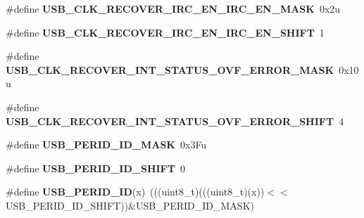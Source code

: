 \begin{DoxyCompactItemize}
\item 
\#define {\bfseries U\+S\+B\+\_\+\+C\+L\+K\+\_\+\+R\+E\+C\+O\+V\+E\+R\+\_\+\+I\+R\+C\+\_\+\+E\+N\+\_\+\+I\+R\+C\+\_\+\+E\+N\+\_\+\+M\+A\+SK}~0x2u\hypertarget{group__USB__Register__Masks_ga0ec64449ae278fc895d80fe9d85882be}{}\label{group__USB__Register__Masks_ga0ec64449ae278fc895d80fe9d85882be}

\item 
\#define {\bfseries U\+S\+B\+\_\+\+C\+L\+K\+\_\+\+R\+E\+C\+O\+V\+E\+R\+\_\+\+I\+R\+C\+\_\+\+E\+N\+\_\+\+I\+R\+C\+\_\+\+E\+N\+\_\+\+S\+H\+I\+FT}~1\hypertarget{group__USB__Register__Masks_ga2e1faca39a2e63ef3c4939b39e8b10c0}{}\label{group__USB__Register__Masks_ga2e1faca39a2e63ef3c4939b39e8b10c0}

\item 
\#define {\bfseries U\+S\+B\+\_\+\+C\+L\+K\+\_\+\+R\+E\+C\+O\+V\+E\+R\+\_\+\+I\+N\+T\+\_\+\+S\+T\+A\+T\+U\+S\+\_\+\+O\+V\+F\+\_\+\+E\+R\+R\+O\+R\+\_\+\+M\+A\+SK}~0x10u\hypertarget{group__USB__Register__Masks_ga159e6afded3ea1fd5360f35010beef77}{}\label{group__USB__Register__Masks_ga159e6afded3ea1fd5360f35010beef77}

\item 
\#define {\bfseries U\+S\+B\+\_\+\+C\+L\+K\+\_\+\+R\+E\+C\+O\+V\+E\+R\+\_\+\+I\+N\+T\+\_\+\+S\+T\+A\+T\+U\+S\+\_\+\+O\+V\+F\+\_\+\+E\+R\+R\+O\+R\+\_\+\+S\+H\+I\+FT}~4\hypertarget{group__USB__Register__Masks_gad67bead4d081f4a50deb6bc8e024ffc7}{}\label{group__USB__Register__Masks_gad67bead4d081f4a50deb6bc8e024ffc7}

\item 
\#define {\bfseries U\+S\+B\+\_\+\+P\+E\+R\+I\+D\+\_\+\+I\+D\+\_\+\+M\+A\+SK}~0x3\+Fu\hypertarget{group__USB__Register__Masks_ga7c4ef4c7ba738b9ec7ee90c6c482c1e5}{}\label{group__USB__Register__Masks_ga7c4ef4c7ba738b9ec7ee90c6c482c1e5}

\item 
\#define {\bfseries U\+S\+B\+\_\+\+P\+E\+R\+I\+D\+\_\+\+I\+D\+\_\+\+S\+H\+I\+FT}~0\hypertarget{group__USB__Register__Masks_ga15b2af97cadcb108b2489e2d29e8957e}{}\label{group__USB__Register__Masks_ga15b2af97cadcb108b2489e2d29e8957e}

\item 
\#define {\bfseries U\+S\+B\+\_\+\+P\+E\+R\+I\+D\+\_\+\+ID}(x)~(((uint8\+\_\+t)(((uint8\+\_\+t)(x))$<$$<$U\+S\+B\+\_\+\+P\+E\+R\+I\+D\+\_\+\+I\+D\+\_\+\+S\+H\+I\+FT))\&U\+S\+B\+\_\+\+P\+E\+R\+I\+D\+\_\+\+I\+D\+\_\+\+M\+A\+SK)\hypertarget{group__USB__Register__Masks_gad306299b648ed1827f0b4a6ad1c81c1d}{}\label{group__USB__Register__Masks_gad306299b648ed1827f0b4a6ad1c81c1d}


\end{DoxyCompactItemize}
